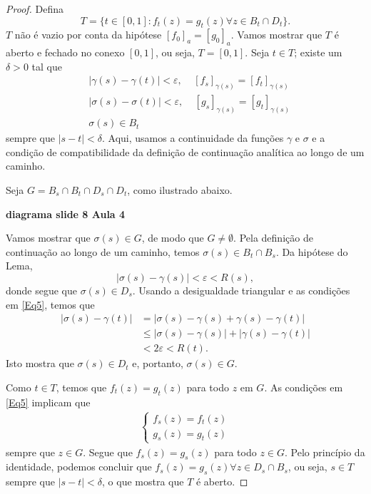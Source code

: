 \begin{proof}
        Defina
        \begin{equation*}
        T = \{t \in [0,1]: f_t(z) = g_t(z) \forall z \in B_t \cap D_t\}.
        \end{equation*}
        $T$ não é vazio por conta da hipótese $[f_0]_a = [g_0]_a$. Vamos mostrar que $T$ é
        aberto e fechado no conexo $[0,1]$, ou seja, $T = [0,1]$. Seja $t \in T$; 
        existe um $\delta > 0$ tal que
        \begin{align}
        \label{Eq5}
            &|\gamma(s) - \gamma(t)| < \varepsilon, \ \ \ \ \ [f_s]_{\gamma(s)} =
            [f_t]_{\gamma(s)} \\
            &|\sigma(s) - \sigma(t)| < \varepsilon, \ \ \ \ \ [g_s]_{\gamma(s)} =
            [g_t]_{\gamma(s)} \\
            &\sigma(s) \in B_t
        \end{align}
        sempre que $|s-t|<\delta$. Aqui, usamos a continuidade da funções $\gamma$ e $\sigma$ 
        e a condição de compatibilidade da definição de continuação analítica ao longo de um
        caminho.
        
        Seja $G = B_s \cap B_t \cap D_s \cap D_t$, como ilustrado abaixo. 
        \begin{center}
            \textbf{diagrama slide 8 Aula 4}
        \end{center}
        Vamos mostrar que 
        $\sigma(s) \in G$, de modo que $G \neq \emptyset$. Pela definição de continuação 
        ao longo de um caminho, temos $\sigma(s) \in B_t \cap B_s$. Da hipótese do Lema,
        \begin{equation*}
        |\sigma(s) - \gamma(s)| < \varepsilon < R(s),
        \end{equation*}
        donde segue que $\sigma(s) \in D_s$. Usando a desigualdade triangular e as condições em \ref{Eq5}, temos que
        \begin{align*}
        |\sigma(s) - \gamma(t)| &= |\sigma(s) - \gamma(s) + \gamma(s) - \gamma(t)| \\
        &\leq |\sigma(s) - \gamma(s)| + |\gamma(s) - \gamma(t)| \\
        &< 2\varepsilon < R(t).
        \end{align*}
        Isto mostra que $\sigma(s) \in D_t$ e, portanto, $\sigma(s) \in G$.
        
        Como $t \in T$, temos que $f_t(z) = g_t(z)$ para todo $z$ em $G$. 
        As condições em \ref{Eq5} implicam que 
        \begin{align*}
            \begin{cases}
                f_s(z) = f_t(z) \\
                g_s(z) = g_t(z)
            \end{cases}
        \end{align*}
        sempre que $z \in G$. Segue que $f_s(z) = g_s(z)$ para todo $z \in G$. 
        Pelo princípio da identidade, podemos concluir que 
        $f_s(z) = g_s(z) \forall z \in D_s \cap B_s$, ou seja, $s \in T$ sempre que 
        $|s-t|< \delta$, o que mostra que $T$ é aberto.
        

\end{proof}
